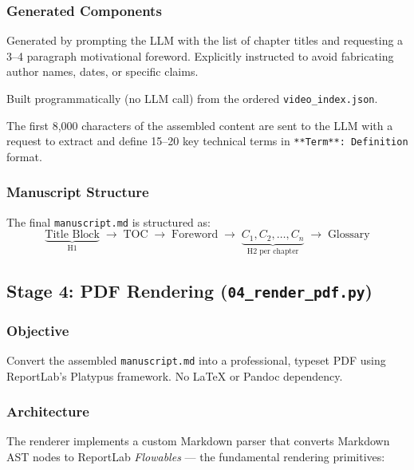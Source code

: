 \documentclass[11pt,a4paper]{article}
\begin{document}
\subsubsection{Generated Components}

\begin{description}[leftmargin=1.5em]
    \item[\textbf{Foreword}] Generated by prompting the LLM with the list of chapter titles and requesting a 3--4 paragraph motivational foreword. Explicitly instructed to avoid fabricating author names, dates, or specific claims.
    \item[\textbf{Table of Contents}] Built programmatically (no LLM call) from the ordered \texttt{video\_index.json}.
    \item[\textbf{Glossary}] The first 8,000 characters of the assembled content are sent to the LLM with a request to extract and define 15--20 key technical terms in \texttt{**Term**: Definition} format.
\end{description}

\subsubsection{Manuscript Structure}

The final \texttt{manuscript.md} is structured as:
\[
\underbrace{\text{Title Block}}_{\text{H1}} \;\to\; \text{TOC} \;\to\; \text{Foreword} \;\to\; \underbrace{C_1, C_2, \ldots, C_n}_{\text{H2 per chapter}} \;\to\; \text{Glossary}
\]

\subsection{Stage 4: PDF Rendering (\texttt{04\_render\_pdf.py})}

\subsubsection{Objective}

Convert the assembled \texttt{manuscript.md} into a professional, typeset PDF using ReportLab's Platypus framework. No LaTeX or Pandoc dependency.

\subsubsection{Architecture}

The renderer implements a custom Markdown parser that converts Markdown AST nodes to ReportLab \textit{Flowables} --- the fundamental rendering primitives:
\end{document}
